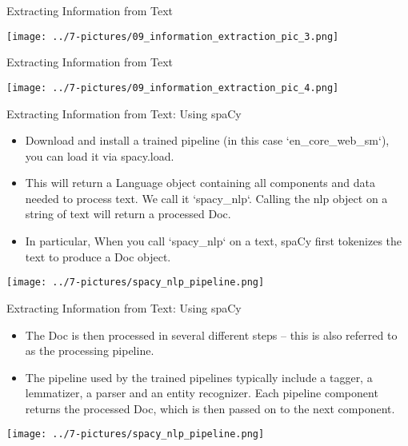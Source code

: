 \documentclass[11pt]{beamer}
\begin{document}
\begin{frame}{Extracting Information from Text}
	\begin{center}
	\texttt{[image: ../7-pictures/09\_information\_extraction\_pic\_3.png]}
	\end{center}
\end{frame}
\begin{frame}{Extracting Information from Text}
	\begin{center}
	\texttt{[image: ../7-pictures/09\_information\_extraction\_pic\_4.png]}
	\end{center}
\end{frame}
\begin{frame}{Extracting Information from Text: Using spaCy}

\begin{itemize}
\item Download and install a trained pipeline (in this case `en\_core\_web\_sm`), you can load it via spacy.load. 
\item This will return a Language object containing all components and data needed to process text. We call it `spacy\_nlp`. Calling the nlp object on a string of text will return a processed Doc. 
\item In particular, When you call `spacy\_nlp` on a text, spaCy first tokenizes the text to produce a Doc object. 
\end{itemize}

	\begin{center}
	\texttt{[image: ../7-pictures/spacy\_nlp\_pipeline.png]}
	\end{center}
\end{frame}
\begin{frame}{Extracting Information from Text: Using spaCy}

\begin{itemize}
\item The Doc is then processed in several different steps – this is also referred to as the processing pipeline. 
\item The pipeline used by the trained pipelines typically include a tagger, a lemmatizer, a parser and an entity recognizer. Each pipeline component returns the processed Doc, which is then passed on to the next component.
\end{itemize}

	\begin{center}
	\texttt{[image: ../7-pictures/spacy\_nlp\_pipeline.png]}
	\end{center}
\end{frame}
\end{document}
